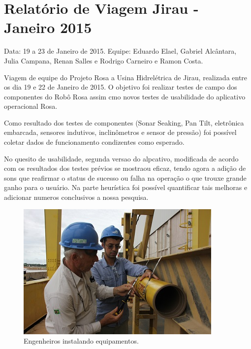 \section{Relatório de Viagem Jirau - Janeiro 2015}
Data: 19 a 23 de Janeiro de 2015.
Equipe: Eduardo Elael, Gabriel Alcântara, Julia Campana, Renan Salles e Rodrigo Carneiro e Ramon Costa.

Viagem de equipe do Projeto Rosa a Usina Hidrelétrica de Jirau, realizada entre
os dia 19 e 22 de Janeiro de 2015. O objetivo foi realizar testes de campo dos
componentes do Robô Rosa assim cmo novos testes de usabilidade do aplicativo
operacional Rosa.

Como resultado dos testes de componentes (Sonar Seaking, Pan Tilt, eletrônica
embarcada, sensores indutivos, inclinômetros e sensor de pressão) foi possível
coletar dados de funcionamento condizentes como esperado.

No quesito de usabilidade, segunda versao do alpcativo, modificada de acordo com
os resultados dos testes prévios se mostraou eficaz, tendo agora a adição de
sons que reafirmar o status de sucesso ou falha na operação o que trouxe grande
ganho para o usuário. Na parte heurística foi possível quantificar tais
melhoras e adicionar numeros conclusivos a nossa pesquisa.



\begin{figure}[h!]
\centering
  \includegraphics[width=1\linewidth]{Fotos/Janeiro2015/5.jpg}
  \caption{Engenheiros instalando equipamentos.}
  \label{nov20131}
\end{figure}


